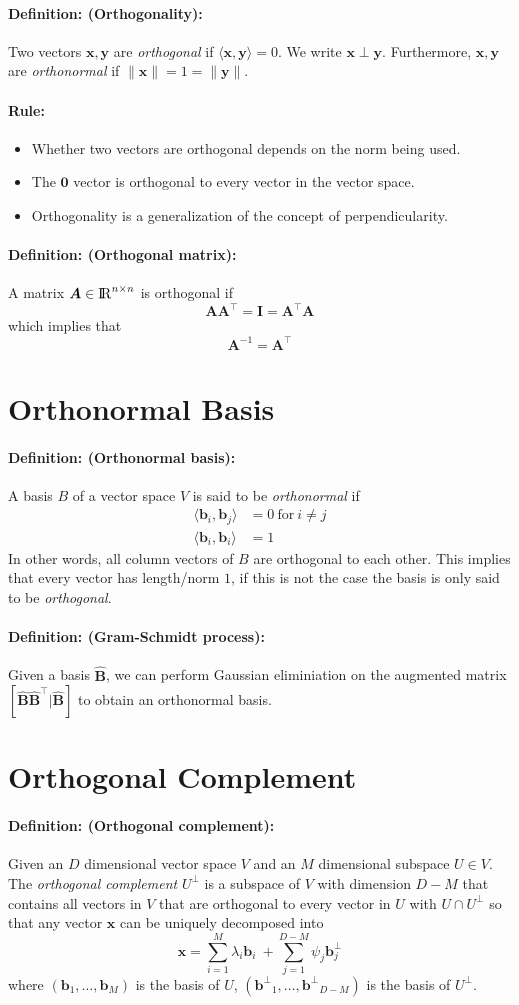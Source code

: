 \documentclass[12pt]{article}
\newcommand{\R}{{\rm I\!R}}
\newcommand{\Rnn}{{\R^{n \times n}}}
\newcommand{\bx}{{\bm{x}}}
\newcommand{\by}{{\bm{y}}}
\newcommand{\bb}{{\bm{b}}}
\newcommand{\A}{{\bm{A}}}
\newcommand{\I}{{\bm{I}}}
\newcommand{\B}{{\bm{B}}}
\newcommand{\0}[0]{\bm{0}}
\newcommand{\ipr}[1]{\langle #1 \rangle}
\newcommand{\norm}[1]{\lVert#1\rVert}
\newcommand{\vecs}[2]{{\bm{#1}_1, \dots, \bm{#1}_#2}}
\newcommand{\xdefinition}[2]{\paragraph{\colorbox{#1!30}{\textbf{Definition:}} (#2):}}
\newcommand{\xrule}[1]{\paragraph{\colorbox{#1!30}{\textbf{Rule:}}}}
\begin{document}
\xdefinition{red}{Orthogonality} Two vectors $\bx, \by$ are \textit{orthogonal} if $\ipr{\bx, \by} = 0$. We write $\bx \perp \by$. Furthermore, $\bx, \by$ are \textit{orthonormal} if $\norm{\bx} = 1 = \norm{\by}$.

\xrule{red}
%
\begin{itemize}
	\item Whether two vectors are orthogonal depends on the norm being used.
	\item The $\0$ vector is orthogonal to every vector in the vector space.
	\item Orthogonality is a generalization of the concept of perpendicularity.
\end{itemize}

\xdefinition{red}{Orthogonal matrix} A matrix $\A \in \Rnn$ is orthogonal if
%
\begin{equation}
	\A \A^{\top} = \I = \A^{\top} \A
\end{equation}
%
which implies that
%
\begin{equation}
	\A^{-1} = \A^{\top}
\end{equation}

\section{Orthonormal Basis}

\xdefinition{red}{Orthonormal basis} A basis $B$ of a vector space $V$ is said to be \textit{orthonormal} if
%
\begin{equation}
\begin{aligned}
	\ipr{\bb_i, \bb_j} &= 0 \ \text{for} \ i \neq j \\
	\ipr{\bb_i, \bb_i} &= 1
\end{aligned}
\end{equation}
%
In other words, all column vectors of $B$ are orthogonal to each other. This implies that every vector has length/norm $1$, if this is not the case the basis is only said to be \textit{orthogonal}.

\xdefinition{red}{Gram-Schmidt process} Given a basis $\hat{\B}$, we can perform Gaussian eliminiation on the augmented matrix $[\hat{\B} \hat{\B}^\top | \hat{\B}]$ to obtain an orthonormal basis.

\section{Orthogonal Complement}

\xdefinition{red}{Orthogonal complement} Given an $D$ dimensional vector space $V$ and an $M$ dimensional subspace $U \in V$. The \textit{orthogonal complement} $U^{\perp}$ is a subspace of $V$ with dimension $D - M$ that contains all vectors in $V$ that are orthogonal to every vector in $U$ with $U \cap U^\perp$ so that any vector $\bx$ can be uniquely decomposed into
%
\begin{equation}
	\bx = \sum\limits_{i=1}^{M} \lambda_i \bb_i \ + \sum\limits_{j=1}^{D-M} \psi_j \bb^{\perp}_j
\end{equation}
%
where $(\vecs{\bb}{M})$ is the basis of $U$, $(\vecs{\bb^{\perp}}{{D-M}})$ is the basis of $U^{\perp}$.
\end{document}
